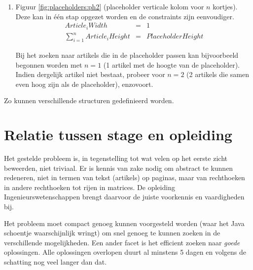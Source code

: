 \documentclass[a4paper,12pt]{report}
\begin{document}
\begin{itemize}
\begin{enumerate}
\begin{itemize}
		\item \underline{Artikel 3 onder artikel 2} (linksonder uitgelijnd (herbruik eq. \ref{eq:linksonder1} en \ref{eq:linksonder2}), onder artikel 2 (eq. \ref{eq:onderart2}))
		
			\begin{eqnarray}
				Article_{3}Height &\leq& Article_{2}EndY \label{eq:onderart2} \\
				Article_{3}Width &\leq& PageWidth \label{eq:randart2}
			\end{eqnarray}
	\end{itemize}
	
	Als artikel 3 geplaatst is, kunnen de overblijvende, lege rechthoeken (de witte rechthoeken van figuur \ref{fig:placeholders:ph1}) bepaald worden. Deze worden op hun beurt opgevuld met artikels of nieuwe placeholders.
	
	\item Figuur \ref{fig:placeholders:ph2} (placeholder verticale kolom voor $n$ kortjes). Deze kan in één stap opgezet worden en de constraints zijn eenvoudiger.
		\begin{eqnarray*}
			Article_{i}Width &=& 1 \\
			\sum_{i=1}^{n}{Article_{i}Height} &=& PlaceholderHeight
		\end{eqnarray*}
		
		Bij het zoeken naar artikels die in de placeholder passen kan bijvoorbeeld begonnen worden met $n=1$ (1 artikel met de hoogte van de placeholder). Indien dergelijk artikel niet bestaat, probeer voor $n=2$ (2 artikels die samen even hoog zijn als de placeholder), enzovoort.
\end{enumerate}
\end{itemize}

Zo kunnen verschillende structuren gedefinieerd worden.


\chapter{Relatie tussen stage en opleiding}
Het gestelde probleem is, in tegenstelling tot wat velen op het eerste zicht beweerden, niet triviaal. Er is kennis van zake nodig om abstract te kunnen redeneren, niet in termen van tekst (artikels) op paginas, maar van rechthoeken in andere rechthoeken tot rijen in matrices. De opleiding Ingenieurswetenschappen brengt daarvoor de juiste voorkennis en vaardigheden bij.

Het probleem moet compact genoeg kunnen voorgesteld worden (waar het Java schoentje waarschijnlijk wringt) om snel genoeg te kunnen zoeken in de verschillende mogelijkheden. Een ander facet is het efficient zoeken naar \textit{goede} oplossingen. Alle oplossingen overlopen duurt al minstens 5 dagen en volgens de schatting nog veel langer dan dat.
\end{document}

